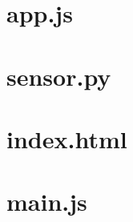\documentclass{thesis}
\begin{document}
\section*{app.js}


\vspace{0.2in}
\section*{sensor.py}


\vspace{0.2in}
\section*{index.html}


\vspace{0.2in}
\section*{main.js}


%
\end{document}
